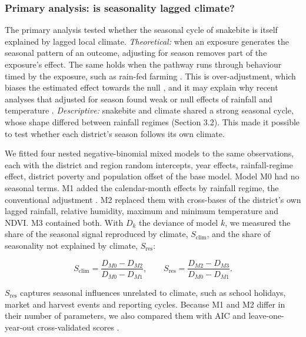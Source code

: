 \documentclass[11pt,a4paper]{article}
\begin{document}
\subsubsection{Primary analysis: is seasonality lagged climate?}

The primary analysis tested whether the seasonal cycle of snakebite is itself explained by lagged local climate. \emph{Theoretical:} when an exposure generates the seasonal pattern of an outcome, adjusting for season removes part of the exposure's effect. The same holds when the pathway runs through behaviour timed by the exposure, such as rain-fed farming \cite{ref5,ref6}. This is over-adjustment, which biases the estimated effect towards the null \cite{ref40}, and it may explain why recent analyses that adjusted for season found weak or null effects of rainfall and temperature \cite{ref12,ref13}. \emph{Descriptive:} snakebite and climate shared a strong seasonal cycle, whose shape differed between rainfall regimes (Section 3.2). This made it possible to test whether each district's season follows its own climate.

We fitted four nested negative-binomial mixed models to the same observations, each with the district and region random intercepts, year effects, rainfall-regime effect, district poverty and population offset of the base model. Model M0 had no seasonal terms. M1 added the calendar-month effects by rainfall regime, the conventional adjustment \cite{ref30}. M2 replaced them with cross-bases of the district's own lagged rainfall, relative humidity, maximum and minimum temperature and NDVI. M3 contained both. With \(D_k\) the deviance of model \(k\), we measured the share of the seasonal signal reproduced by climate, \(S_{\text{clim}}\), and the share of seasonality not explained by climate, \(S_{\text{res}}\):

\[S_{\text{clim}} = \frac{D_{M0} - D_{M2}}{D_{M0} - D_{M1}}, \qquad S_{\text{res}} = \frac{D_{M2} - D_{M3}}{D_{M0} - D_{M1}}.\]

\(S_{\text{res}}\) captures seasonal influences unrelated to climate, such as school holidays, market and harvest events and reporting cycles. Because M1 and M2 differ in their number of parameters, we also compared them with AIC and leave-one-year-out cross-validated scores \cite{ref37,ref38}.
\end{document}
